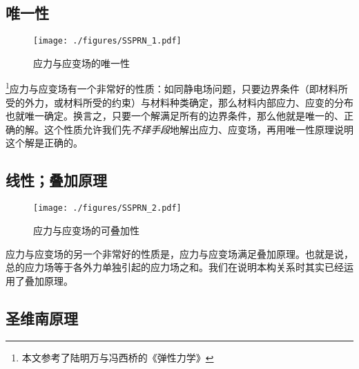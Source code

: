 
\begin{issues}
\issueDraft
\end{issues}


\subsection{唯一性}
\begin{figure}[ht]
\centering
\texttt{[image: ./figures/SSPRN\_1.pdf]}
\caption{应力与应变场的唯一性} \label{SSPRN_fig1}
\end{figure}
\footnote{本文参考了陆明万与冯西桥的《弹性力学》}应力与应变场有一个非常好的性质：如同静电场问题，只要边界条件（即材料所受的外力，或材料所受的约束）与材料种类确定，那么材料内部应力、应变的分布也就唯一确定。换言之，只要一个解满足所有的边界条件，那么他就是唯一的、正确的解。这个性质允许我们先\textsl{不择手段}地解出应力、应变场，再用唯一性原理说明这个解是正确的。

\subsection{线性；叠加原理}
\begin{figure}[ht]
\centering
\texttt{[image: ./figures/SSPRN\_2.pdf]}
\caption{应力与应变场的可叠加性} \label{SSPRN_fig2}
\end{figure}
应力与应变场的另一个非常好的性质是，应力与应变场满足叠加原理。也就是说，总的应力场等于各外力单独引起的应力场之和。我们在说明本构关系时其实已经运用了叠加原理。%

\subsection{圣维南原理}
